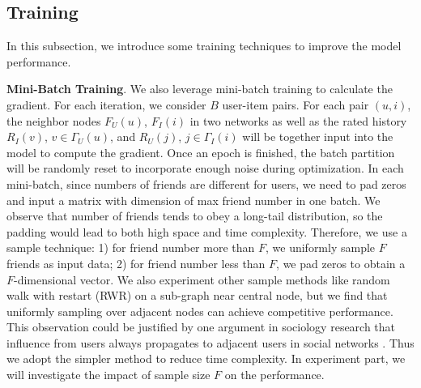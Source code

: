 \documentclass[sigconf]{acmart}
\begin{document}
\subsection{Training}
In this subsection, we introduce some training techniques to improve the model performance.

\textbf{Mini-Batch Training}. We also leverage mini-batch training to calculate the gradient. For each iteration, we consider $B$ user-item pairs. For each pair $(u,i)$, the neighbor nodes $F_U(u)$, $F_I(i)$ in two networks as well as the rated history $R_I(v)$, $v\in\Gamma_U(u)$, and $R_U(j)$, $j\in\Gamma_I(i)$ will be together input into the model to compute the gradient. Once an epoch is finished, the batch partition will be randomly reset to incorporate enough noise during optimization. In each mini-batch, since numbers of friends are different for users, we need to pad zeros and input a matrix with dimension of max friend number in one batch. We observe that number of friends tends to obey a long-tail distribution, so the padding would lead to both high space and time complexity. Therefore, we use a sample technique: 1) for friend number more than $F$, we uniformly sample $F$ friends as input data; 2) for friend number less than $F$, we pad zeros to obtain a $F$-dimensional vector. We also experiment other sample methods like random walk with restart (RWR) \cite{RWR} on a sub-graph near central node, but we find that uniformly sampling over adjacent nodes can achieve competitive performance. This observation could be justified by one argument in sociology research that influence from users always propagates to adjacent users in social networks \cite{WSDM}. Thus we adopt the simpler method to reduce time complexity. In experiment part, we will investigate the impact of sample size $F$ on the performance.
\end{document}

